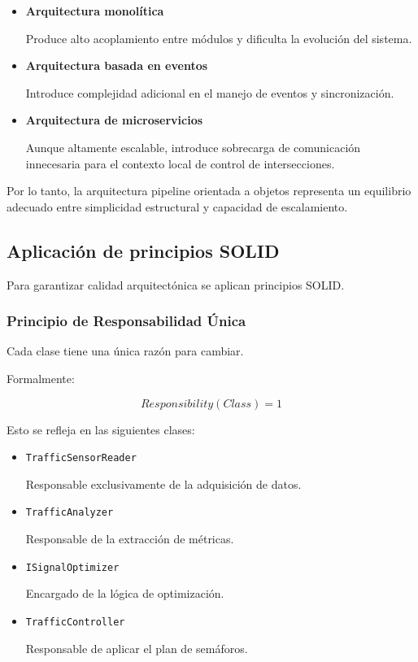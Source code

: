\documentclass[12pt]{article}
\begin{document}
\begin{itemize}

\item \textbf{Arquitectura monolítica}

Produce alto acoplamiento entre módulos y dificulta la evolución del sistema.

\item \textbf{Arquitectura basada en eventos}

Introduce complejidad adicional en el manejo de eventos y sincronización.

\item \textbf{Arquitectura de microservicios}

Aunque altamente escalable, introduce sobrecarga de comunicación innecesaria para el contexto local de control de intersecciones.

\end{itemize}

Por lo tanto, la arquitectura pipeline orientada a objetos representa un equilibrio adecuado entre simplicidad estructural y capacidad de escalamiento.

\subsection{Aplicación de principios SOLID}

Para garantizar calidad arquitectónica se aplican principios SOLID.

\subsubsection{Principio de Responsabilidad Única}

Cada clase tiene una única razón para cambiar.

Formalmente:

\[
Responsibility(Class) = 1
\]

Esto se refleja en las siguientes clases:

\begin{itemize}

\item \texttt{TrafficSensorReader}

Responsable exclusivamente de la adquisición de datos.

\item \texttt{TrafficAnalyzer}

Responsable de la extracción de métricas.

\item \texttt{ISignalOptimizer}

Encargado de la lógica de optimización.

\item \texttt{TrafficController}

Responsable de aplicar el plan de semáforos.

\end{itemize}
\end{document}
